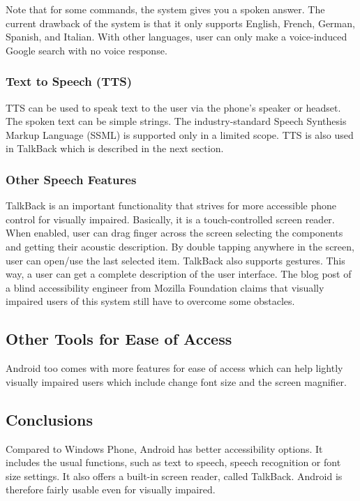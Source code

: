 Note that for some commands, the system gives you a spoken answer. The current drawback of the system is that it only supports English, French, German, Spanish, and Italian. With other languages, user can only make a voice-induced Google search with no voice response.
\subsubsection{Text to Speech (TTS)}
TTS can be used to speak text to the user via the phone's speaker or headset. The spoken text can be simple strings. The industry-standard Speech Synthesis Markup Language (SSML) is supported only in a limited scope. TTS is also used in TalkBack which is described in the next section.
\subsubsection{Other Speech Features}
TalkBack is an important functionality that strives for more accessible phone control for visually impaired. Basically, it is a touch-controlled screen reader. When enabled, user can drag finger across the screen selecting the components and getting their acoustic description. By double tapping anywhere in the screen, user can open/use the last selected item. TalkBack also supports gestures. This way, a user can get a complete description of the user interface. The blog post of a blind accessibility engineer from Mozilla Foundation \cite{mozillaguy} claims that visually impaired users of this system still have to overcome some obstacles.

\subsection{Other Tools for Ease of Access}
Android too comes with more features for ease of access which can help lightly visually impaired users which include change font size and the screen magnifier.

\subsection{Conclusions}
Compared to Windows Phone, Android has better accessibility options. It includes the usual functions, such as text to speech, speech recognition or font size settings. It also offers a built-in screen reader, called TalkBack. Android is therefore fairly usable even for visually impaired.

\endinput
